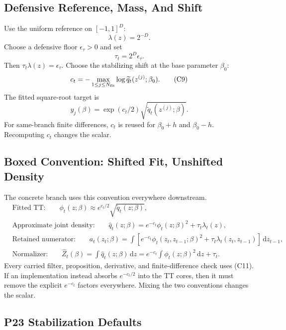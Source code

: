 \documentclass[11pt]{article}
\newcommand{\dd}{\,\mathrm d}
\begin{document}
\subsection{Defensive Reference, Mass, And Shift}

Use the uniform reference on \([-1,1]^D\):
\[
    \lambda(z)=2^{-D}.
    \tag{C7}
\]
Choose a defensive floor \(\epsilon_\tau>0\) and set
\[
    \tau_t=2^D\epsilon_\tau.
    \tag{C8}
\]
Then \(\tau_t\lambda(z)=\epsilon_\tau\).  Choose the stabilizing shift at the
base parameter \(\beta_0\):
\[
    c_t=-\max_{1\le j\le N_{\rm fit}}
    \log \widetilde q_t(z^{(j)};\beta_0).
    \tag{C9}
\]
The fitted square-root target is
\[
    y_j(\beta)=\exp(c_t/2)\sqrt{\widetilde q_t(z^{(j)};\beta)}.
    \tag{C10}
\]
For same-branch finite differences, \(c_t\) is reused for
\(\beta_0+h\) and \(\beta_0-h\).  Recomputing \(c_t\) changes the scalar.

\subsection{Boxed Convention: Shifted Fit, Unshifted Density}

The concrete branch uses this convention everywhere downstream.
\[
\boxed{
\begin{aligned}
&\text{Fitted TT:}\qquad
  \phi_t(z;\beta)\approx e^{c_t/2}\sqrt{\widetilde q_t(z;\beta)},\\
&\text{Approximate joint density:}\qquad
  \widehat q_t(z;\beta)
  =
  e^{-c_t}\phi_t(z;\beta)^2+\tau_t\lambda_t(z),\\
&\text{Retained numerator:}\qquad
  a_t(z_t;\beta)
  =
  \int
  \left[e^{-c_t}\phi_t(z_t,z_{t-1};\beta)^2
        +\tau_t\lambda_t(z_t,z_{t-1})\right]\dd z_{t-1},\\
&\text{Normalizer:}\qquad
  \widehat Z_t(\beta)
  =
  \int \widehat q_t(z;\beta)\dd z
  =
  e^{-c_t}\int\phi_t(z;\beta)^2\dd z+\tau_t.
\end{aligned}}
\tag{C11}
\]
Every carried filter, proposition, derivative, and finite-difference check uses
(C11).  If an implementation instead absorbs \(e^{-c_t/2}\) into the TT cores,
then it must remove the explicit \(e^{-c_t}\) factors everywhere.  Mixing the
two conventions changes the scalar.

\subsection*{P23 Stabilization Defaults}
\end{document}

